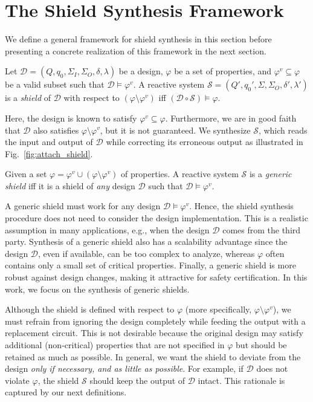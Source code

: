 \documentclass{llncs}
\newcommand{\design}{\mathcal{D}}
\newcommand{\shield}{\mathcal{S}}
\newcommand{\states}{Q}
\newcommand{\init}{q_0}
\newcommand{\dinalph}{\Sigma_I}
\newcommand{\doutalph}{\Sigma_O}
\newcommand{\dalph}{\Sigma}
\newcommand{\spec}{\varphi}
\newcommand{\specv}{\varphi^v}
\newcommand{\comp}{\circ}
\begin{document}
\section{The Shield Synthesis Framework} 
\label{sec:frame}

We define a general framework for shield synthesis in this section 
before presenting a concrete realization of this framework in the next 
section.

\begin{definition}[Shield]
Let $\design = (\states, \init, \dinalph, \doutalph, \delta, \lambda)$ 
be a design, $\spec$ be a set of properties, and $\specv\subseteq \spec$ 
be a valid subset such that $\design \models \specv$.  A reactive system 
$\shield = (\states', \init', \dalph, \doutalph, \delta', \lambda')$ is 
a \emph{shield} of $\design$ with respect to $(\spec\setminus\specv)$ 
iff $(\design \comp \shield) \models \spec$.
\end{definition}

\noindent
Here, the design is known to satisfy $\specv\subseteq \spec$. 
Furthermore, we are in good faith that $\design$ also satisfies $\spec 
\setminus \specv$, but it is not guaranteed.  We synthesize $\shield$, 
which reads the input and output of $\design$ while correcting its 
erroneous output as illustrated in Fig.~\ref{fig:attach_shield}.

\begin{definition}
Given a set $\spec = \specv \cup (\spec\setminus\specv)$ of properties.  
A reactive system $\shield$ is a \emph{generic shield} iff it is a 
shield of \emph{any} design $\design$ such that $\design \models 
\specv$.
\end{definition}

\noindent
A generic shield must work for any design $\design \models \specv$. 
Hence, the shield synthesis procedure does not need to consider the 
design implementation.  This is a realistic assumption in many 
applications, e.g., when the design $\design$ comes from the third 
party.  Synthesis of a generic shield also has a scalability advantage 
since the design $\design$, even if available, can be too complex to 
analyze, whereas $\spec$ often contains only a small set of critical
properties.  Finally, a generic shield is more robust against design 
changes, making it attractive for safety certification.  In this work, 
we focus on the synthesis of generic shields.

Although the shield is defined with respect to $\spec$ (more 
specifically, $\spec\setminus\specv$), we must refrain from ignoring the 
design completely while feeding the output with a replacement circuit.  
This is not desirable because the original design may satisfy additional 
(non-critical) properties that are not specified in $\spec$ but should 
be retained as much as possible.  In general, we want the shield to 
deviate from the design \emph{only if necessary, and as little as 
possible}.  For example, if $\design$ does not violate $\spec$, the 
shield $\shield$ should keep the output of $\design$ intact.  This 
rationale is captured by our next definitions.
\end{document}
